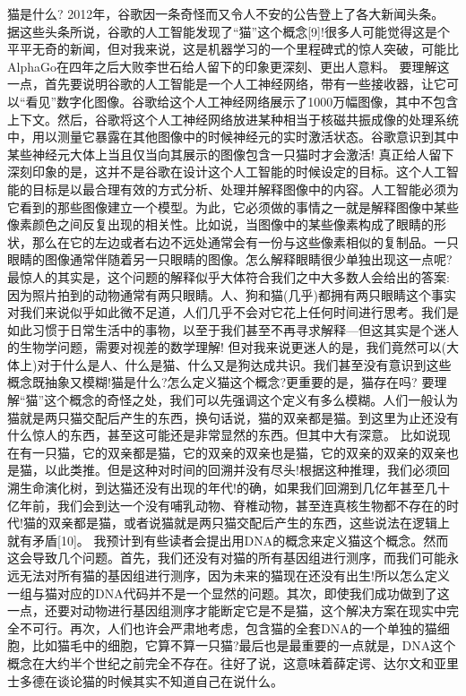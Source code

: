 猫是什么?
2012年，谷歌因一条奇怪而又令人不安的公告登上了各大新闻头条。
据这些头条所说，谷歌的人工智能发现了“猫”这个概念[9]!很多人可能觉得这是个平平无奇的新闻，但对我来说，这是机器学习的一个里程碑式的惊人突破，可能比AlphaGo在四年之后大败李世石给人留下的印象更深刻、更出人意料。
要理解这一点，首先要说明谷歌的人工智能是一个人工神经网络，带有一些接收器，让它可以“看见”数字化图像。谷歌给这个人工神经网络展示了1000万幅图像，其中不包含上下文。然后，谷歌将这个人工神经网络放进某种相当于核磁共振成像的处理系统中，用以测量它暴露在其他图像中的时候神经元的实时激活状态。谷歌意识到其中某些神经元大体上当且仅当向其展示的图像包含一只猫时才会激活!
真正给人留下深刻印象的是，这并不是谷歌在设计这个人工智能的时候设定的目标。这个人工智能的目标是以最合理有效的方式分析、处理并解释图像中的内容。人工智能必须为它看到的那些图像建立一个模型。为此，它必须做的事情之一就是解释图像中某些像素颜色之间反复出现的相关性。比如说，当图像中的某些像素构成了眼睛的形
状，那么在它的左边或者右边不远处通常会有一份与这些像素相似的复制品。一只眼睛的图像通常伴随着另一只眼睛的图像。怎么解释眼睛很少单独出现这一点呢?
最惊人的其实是，这个问题的解释似乎大体符合我们之中大多数人会给出的答案:因为照片拍到的动物通常有两只眼睛。人、狗和猫(几乎)都拥有两只眼睛这个事实对我们来说似乎如此微不足道，人们几乎不会对它花上任何时间进行思考。我们是如此习惯于日常生活中的事物，以至于我们甚至不再寻求解释---但这其实是个迷人的生物学问题，需要对视差的数学理解!
但对我来说更迷人的是，我们竟然可以(大体上)对于什么是人、什么是猫、什么又是狗达成共识。我们甚至没有意识到这些概念既抽象又模糊!猫是什么?怎么定义猫这个概念?更重要的是，猫存在吗?
要理解“猫”这个概念的奇怪之处，我们可以先强调这个定义有多么模糊。人们一般认为猫就是两只猫交配后产生的东西，换句话说，猫的双亲都是猫。到这里为止还没有什么惊人的东西，甚至这可能还是非常显然的东西。但其中大有深意。
比如说现在有一只猫，它的双亲都是猫，它的双亲的双亲也是猫，它的双亲的双亲的双亲也是猫，以此类推。但是这种对时间的回溯并没有尽头!根据这种推理，我们必须回溯生命演化树，到达猫还没有出现的年代!的确，如果我们回溯到几亿年甚至几十亿年前，我们会到达一个没有哺乳动物、脊椎动物，甚至连真核生物都不存在的时代!猫的双亲都是猫，或者说猫就是两只猫交配后产生的东西，这些说法在逻辑上就有矛盾[10]。
我预计到有些读者会提出用DNA的概念来定义猫这个概念。然而这会导致几个问题。首先，我们还没有对猫的所有基因组进行测序，而我们可能永远无法对所有猫的基因组进行测序，因为未来的猫现在还没有出生!所以怎么定义一组与猫对应的DNA代码并不是一个显然的问题。其次，即使我们成功做到了这一点，还要对动物进行基因组测序才能断定它是不是猫，这个解决方案在现实中完全不可行。再次，人们也许会严肃地考虑，包含猫的全套DNA的一个单独的猫细胞，比如猫毛中的细胞，它算不算一只猫?最后也是最重要的一点就是，DNA这个概念在大约半个世纪之前完全不存在。往好了说，这意味着薛定谔、达尔文和亚里士多德在谈论猫的时候其实不知道自己在说什么。
